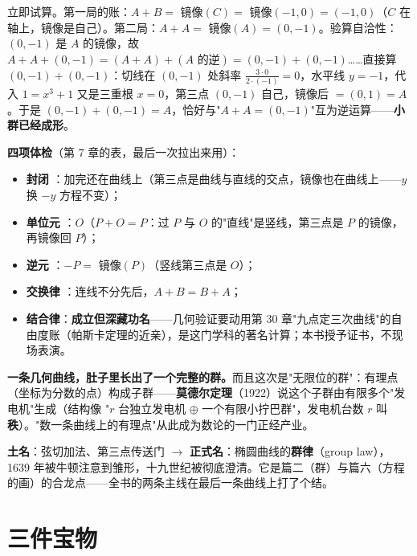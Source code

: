 立即试算。第一局的账：$A + B = $ 镜像$(C) = $ 镜像$(-1, 0) = (-1, 0)$（$C$ 在轴上，镜像是自己）。第二局：$A + A = $ 镜像$(A) = (0, -1)$。验算自洽性：$(0,-1)$ 是 $A$ 的镜像，故 $A + A + (0,-1) = (A+A) + (A \text{ 的逆}) = (0,-1)+(0,-1)$……直接算 $(0,-1)+(0,-1)$：切线在 $(0,-1)$ 处斜率 $\tfrac{3\cdot0}{2\cdot(-1)} = 0$，水平线 $y = -1$，代入 $1 = x^3+1$ 又是三重根 $x=0$，第三点 $(0,-1)$ 自己，镜像后 $= (0,1) = A$。于是 $(0,-1)+(0,-1) = A$，恰好与"$A+A = (0,-1)$"互为逆运算——\textbf{小群已经成形}。

\textbf{四项体检}（第 7 章的表，最后一次拉出来用）：
\begin{itemize}
\item \textbf{封闭} \checkmark：加完还在曲线上（第三点是曲线与直线的交点，镜像也在曲线上——$y$ 换 $-y$ 方程不变）；
\item \textbf{单位元} \checkmark：$O$（$P + O = P$：过 $P$ 与 $O$ 的"直线"是竖线，第三点是 $P$ 的镜像，再镜像回 $P$）；
\item \textbf{逆元} \checkmark：$-P = $ 镜像$(P)$（竖线第三点是 $O$）；
\item \textbf{交换律} \checkmark：连线不分先后，$A + B = B + A$；
\item \textbf{结合律}：\textbf{成立但深藏功名}——几何验证要动用第 30 章"九点定三次曲线"的自由度账（帕斯卡定理的近亲），是这门学科的著名计算；本书授予证书，不现场表演。
\end{itemize}
\textbf{一条几何曲线，肚子里长出了一个完整的群。}而且这次是"无限位的群"：有理点（坐标为分数的点）构成子群——\textbf{莫德尔定理}（1922）说这个子群由有限多个"发电机"生成（结构像 "$r$ 台独立发电机 $\oplus$ 一个有限小拧巴群"，发电机台数 $r$ 叫\textbf{秩}）。"数一条曲线上的有理点"从此成为数论的一门正经产业。

\begin{faming}
\textbf{土名}：弦切加法、第三点传送门 $\to$ \textbf{正式名}：椭圆曲线的\textbf{群律}（group law），1639 年被牛顿注意到雏形，十九世纪被彻底澄清。它是篇二（群）与篇六（方程的画）的合龙点——全书的两条主线在最后一条曲线上打了个结。
\end{faming}

\section{三件宝物}

